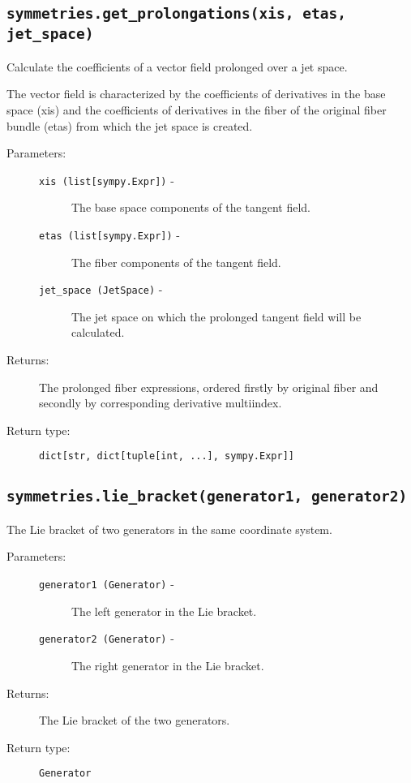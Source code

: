 \subsection*{\lstinline{symmetries.get_prolongations(xis, etas, jet_space)}}

   Calculate the coefficients of a vector field prolonged over a jet
   space.

   The vector field is characterized by the coefficients of
   derivatives in the base space (xis) and the coefficients of
   derivatives in the fiber of the original fiber bundle (etas) from
   which the jet space is created.

   \begin{description}
      \item[Parameters:] \leavevmode
        \begin{description}
            \item[\lstinline{xis (list[sympy.Expr])} -] The base space components of the tangent field.
            \item[\lstinline{etas (list[sympy.Expr])} -] The fiber components of the tangent field.
            \item[\lstinline{jet_space (JetSpace)} -] The jet space on which the prolonged tangent field will be calculated.
        \end{description}
      \item[Returns:] The prolonged fiber expressions, ordered firstly by original fiber and secondly by corresponding derivative multiindex.
      \item[Return type:] \lstinline{dict[str, dict[tuple[int, ...], sympy.Expr]]}
   \end{description}

\subsection*{\lstinline{symmetries.lie_bracket(generator1, generator2)}}

   The Lie bracket of two generators in the same coordinate system.

   \begin{description}
      \item[Parameters:] \leavevmode
        \begin{description}
            \item[\lstinline{generator1 (Generator)} -] The left generator in the Lie bracket.
            \item[\lstinline{generator2 (Generator)} -] The right generator in the Lie bracket.
        \end{description}
      \item[Returns:] The Lie bracket of the two generators.
      \item[Return type:] \lstinline{Generator}
   \end{description}

